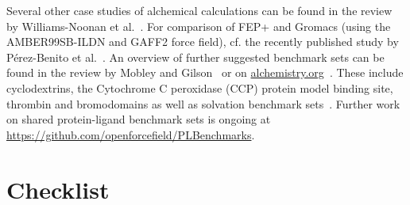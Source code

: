 \documentclass[9pt,bestpractices]{livecoms}
\begin{document}
Several other case studies of alchemical calculations can be found in the review by Williams-Noonan et al.~\cite{williams-noonan2018free}. For comparison of FEP+ and Gromacs (using the AMBER99SB-ILDN and GAFF2 force field), cf. the recently published study by Pérez-Benito et al.~\cite{perez-benito2019predicting}.
An overview of further suggested benchmark sets can be found in the review by Mobley and Gilson~\cite{mobley2017predicting} or on \url{alchemistry.org}~\cite{alchemistry}. These include cyclodextrins, the Cytochrome C peroxidase (CCP) protein model binding site, thrombin and bromodomains as well as solvation benchmark sets~\cite{paliwal2011benchmark}. Further work on shared protein-ligand benchmark sets is ongoing at \url{https://github.com/openforcefield/PLBenchmarks}.

\section{Checklist}
\label{sec:checklist}


\end{document}
